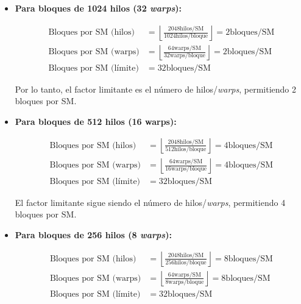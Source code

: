             \begin{itemize}

                \item \textbf{Para bloques de 1024 hilos (32 \textit{warps}):}
                
                    \begin{align*}
                        \text{Bloques por SM (hilos)} &= \left\lfloor \frac{2048 \text{hilos/SM}}{1024 \text{hilos/bloque}} \right\rfloor = 2 \text{bloques/SM}\\
                        \text{Bloques por SM (warps)} &= \left\lfloor \frac{64 \text{warps/SM}}{32 \text{warps/bloque}} \right\rfloor = 2 \text{bloques/SM}\\
                        \text{Bloques por SM (límite)} &= 32 \text{bloques/SM}
                    \end{align*}
                    
                    Por lo tanto, el factor limitante es el número de hilos/\textit{warps}, permitiendo 2 bloques por SM.
            
                \item \textbf{Para bloques de 512 hilos (16 warps):}
    
                    \begin{align*}
                        \text{Bloques por SM (hilos)} &= \left\lfloor \frac{2048 \text{hilos/SM}}{512 \text{hilos/bloque}} \right\rfloor = 4 \text{bloques/SM}\\
                        \text{Bloques por SM (warps)} &= \left\lfloor \frac{64 \text{warps/SM}}{16 \text{warps/bloque}} \right\rfloor = 4 \text{bloques/SM}\\
                        \text{Bloques por SM (límite)} &= 32 \text{bloques/SM}
                    \end{align*}
                    
                    El factor limitante sigue siendo el número de hilos/\textit{warps}, permitiendo 4 bloques por SM.
            
                \item \textbf{Para bloques de 256 hilos (8 \textit{warps}):}

                    \begin{align*}
                        \text{Bloques por SM (hilos)} &= \left\lfloor \frac{2048 \text{hilos/SM}}{256 \text{hilos/bloque}} \right\rfloor = 8 \text{bloques/SM}\\
                        \text{Bloques por SM (warps)} &= \left\lfloor \frac{64 \text{warps/SM}}{8 \text{warps/bloque}} \right\rfloor = 8 \text{bloques/SM}\\
                        \text{Bloques por SM (límite)} &= 32 \text{bloques/SM}
                    \end{align*}
                    

\end{itemize}
